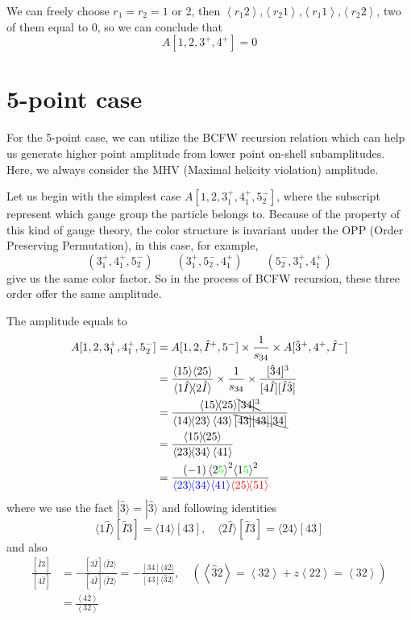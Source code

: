 \documentclass[12pt]{article}
\newcommand{\mdavg}[2]{\langle #1 \rangle\!\langle #2 \rangle}
\newcommand{\avg}[1]{\left\langle #1 \right\rangle}
\newcommand{\doubleavg}[2]{\left\langle #1 \right\rangle\!\left\langle #2 \right\rangle}
\newcommand{\inavg}[2]{\langle #1 \rangle\! [#2]}
\newcommand{\rinavg}[2]{[#1]\!\langle #2 \rangle}
\begin{document}
We can freely choose $r_1=r_2=1$ or 2, then $\avg{r_1 2}$,$\avg{r_2 1}$,$\avg{r_1 1}$,$\avg{r_2 2}$, two of them equal to 0, so we can conclude that
\begin{equation*}
    A[1,2,3^+,4^+]=0
\end{equation*}
\section{5-point case}
For the 5-point case, we can utilize the BCFW recursion relation which can help us generate higher point amplitude from lower point on-shell subamplitudes. Here, 
we always consider the MHV (Maximal helicity violation) amplitude. 
\par
Let us begin with the simplest case $A[1,2,3_1^+,4_1^+,5_2^-]$, where the subscript represent which gauge group the particle belongs to. Because of the property 
of this kind of gauge theory, the color structure is invariant under the OPP (Order Preserving Permutation), in this case, for example,
\begin{equation*}
    (3_1^+,4_1^+,5_2^-)\qquad (3_1^+,5_2^-,4_1^+)\qquad(5_2^-,3_1^+,4_1^+)
\end{equation*}
give us the same color factor. So in the process of BCFW recursion, these three order offer the same amplitude.
\par
The amplitude equals to
\begin{align*}
    A[1,2,3_1^+,4_1^+,5_2^-]&=A[1,2,\hat{I}^+,5^-]\times\frac{1}{s_{34}}\times A[\hat{3}^+,4^+,\hat{I}^-]\\
    &=\frac{\doubleavg{15}{25}}{\mdavg{1\hat{I}}{2\hat{I}}}\times\frac{1}{s_{34}}\times\frac{[\hat{3}4]^3}{[4\hat{I}][\hat{I}\hat{3}]}\\
    &=\frac{\mdavg{15}{25}\bcancel{[34]^3}}{\mdavg{14}{23}\avg{43}\bcancel{[43][43][34]}}\\
    &=\frac{\mdavg{15}{25}}{\mdavg{23}{34}\avg{41}}\\
    &=\frac{(-1)\avg{2\textcolor{green}{5}}^2\!\avg{1\textcolor{green}{5}}^2}{\textcolor{blue}{\mdavg{23}{34}\!\avg{41}}\textcolor{red}{\mdavg{25}{51}}}
\end{align*}
where we use the fact $|\hat{3}\rangle=|\hat{3}\rangle$ and following identities
\begin{equation*}
    \inavg{1\hat{I}}{\hat{I}3}=\inavg{14}{43},\quad \inavg{2\hat{I}}{\hat{I}3}=\inavg{24}{43}
\end{equation*}
and also
\begin{align*}
    \frac{[\hat{I}3]}{[4\hat{I}]}&=-\frac{\rinavg{3\hat{I}}{\hat{I}2}}{\rinavg{4\hat{I}}{\hat{I}2}}=-\frac{\rinavg{34}{42}}{\rinavg{43}{\hat{3}2}},\quad(\avg{\hat{3}2}=\avg{32}+z\avg{22}=\avg{32})\\
    &=\frac{\avg{42}}{\avg{32}}
\end{align*}
\end{document}
